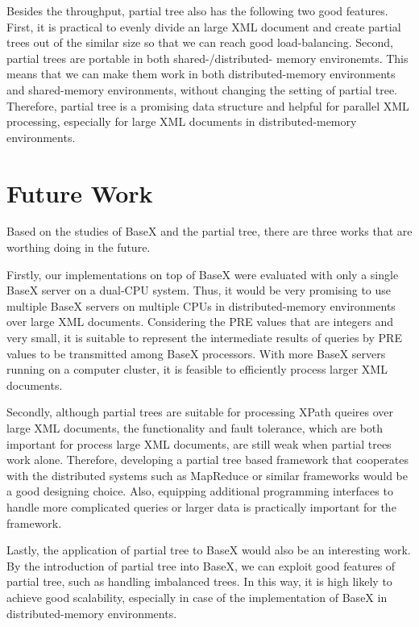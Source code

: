 Besides the throughput, partial tree also has the following two good features.
First, it is practical to evenly divide an large XML document and create partial
trees out of the similar size so that we can reach good load-balancing. Second,
partial trees are portable in both shared-/distributed- memory environemts. This
means that we can make them work in both distributed-memory environments and
shared-memory environments, without changing the setting of partial tree.
Therefore, partial tree is a promising data structure and helpful for parallel
XML processing, especially for large XML documents in distributed-memory
environments.

\section{Future Work}

Based on the studies of BaseX and the partial tree, there are three works that
are worthing doing in the future.

Firstly, our implementations on top of BaseX were evaluated with only a single
BaseX server on a dual-CPU system. Thus, it would be very promising to use
multiple BaseX servers on multiple CPUs in distributed-memory environments over
large XML documents. Considering the PRE values that are integers and very
small, it is suitable to represent the intermediate results of queries by PRE
values to be transmitted among BaseX processors. With more BaseX servers running
on a computer cluster, it is feasible to efficiently process larger XML
documents.

Secondly, although partial trees are suitable for processing XPath queires over
large XML documents, the functionality and fault tolerance, which are both
important for process large XML documents, are still weak when partial trees
work alone. Therefore, developing a partial tree based framework that cooperates
with the distributed systems such as MapReduce or similar frameworks would be a
good designing choice. Also, equipping additional programming interfaces to
handle more complicated queries or larger data is practically important for the
framework.

Lastly, the application of partial tree to BaseX would also be an interesting
work. By the introduction of partial tree into BaseX, we can exploit good
features of partial tree, such as handling imbalanced trees. In this way, it is
high likely to achieve good scalability, especially in case of the
implementation of BaseX in distributed-memory environments.
